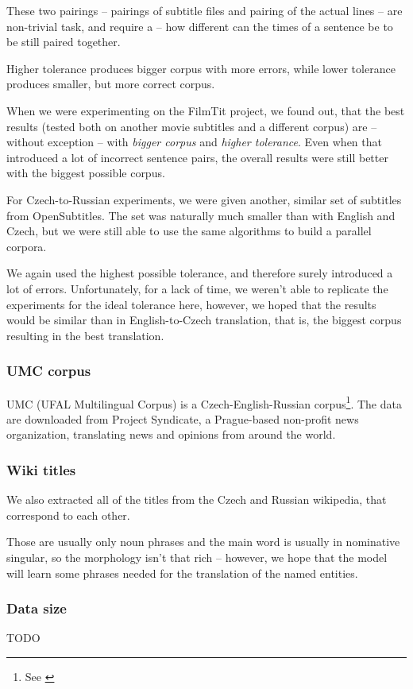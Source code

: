 These two pairings -- pairings of subtitle files and pairing of the actual lines -- are non-trivial task, and require a  -- how different can the times of a sentence be to be still paired together.

Higher tolerance produces bigger corpus with more errors, while lower tolerance produces smaller, but more correct corpus.

When we were experimenting on the FilmTit project, we found out, that the best results (tested both on another movie subtitles and a different corpus) are -- without exception -- with \emph{bigger corpus} and \emph{higher tolerance}. Even when that introduced a lot of incorrect sentence pairs, the overall results were still better with the biggest possible corpus.

For Czech-to-Russian experiments, we were given another, similar set of subtitles from OpenSubtitles. The set was naturally much smaller than with English and Czech, but we were still able to use the same algorithms to build a parallel corpora.

We again used the highest possible tolerance, and therefore surely introduced a lot of errors. Unfortunately, for a lack of time, we weren't able to replicate the experiments for the ideal tolerance here, however, we hoped that the results would be similar than in English-to-Czech translation, that is, the biggest corpus resulting in the best translation.

\subsubsection{UMC corpus}
UMC (UFAL Multilingual Corpus) is a Czech-English-Russian corpus\footnote{See \cite{umc}}. The data are downloaded from Project Syndicate, a Prague-based non-profit news organization, translating news and opinions from around the world.


\subsubsection{Wiki titles}
We also extracted all of the titles from the Czech and Russian wikipedia, that correspond to each other.

Those are usually only noun phrases and the main word is usually in nominative singular, so the morphology isn't that rich -- however, we hope that the model will learn some phrases needed for the translation of the named entities.
\subsubsection{Data size}
TODO

